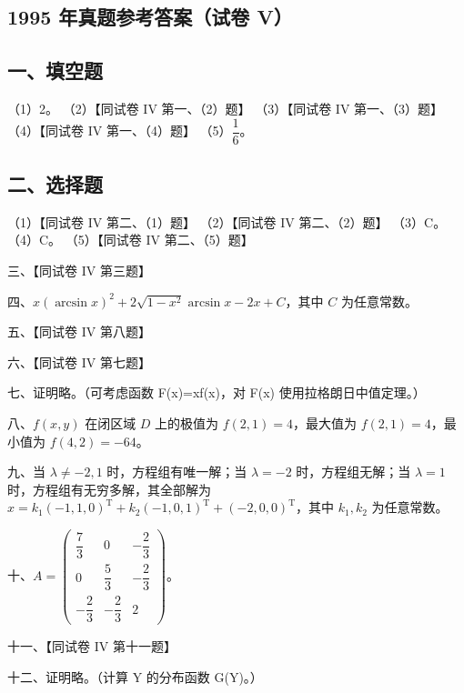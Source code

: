 \documentclass[UTF8,12pt]{ctexart}
\begin{document}
\subsection*{1995 年真题参考答案（试卷 V）}

\subsection*{一、填空题}

（1）2。 （2）【同试卷 IV 第一、（2）题】 （3）【同试卷 IV 第一、（3）题】 （4）【同试卷 IV 第一、（4）题】 （5）\(\displaystyle \dfrac{\displaystyle 1}{\displaystyle 6}\)。


\subsection*{二、选择题}

（1）【同试卷 IV 第二、（1）题】 （2）【同试卷 IV 第二、（2）题】 （3）C。 （4）C。 （5）【同试卷 IV 第二、（5）题】


三、【同试卷 IV 第三题】


四、\(\displaystyle x(\arcsin x)^2+2\sqrt{1-x^2}\arcsin x-2x+C\)，其中 \(\displaystyle C\) 为任意常数。


五、【同试卷 IV 第八题】


六、【同试卷 IV 第七题】


七、证明略。（可考虑函数 F(x)=xf(x)，对 F(x) 使用拉格朗日中值定理。）


八、\(\displaystyle f(x,\allowbreak y)\) 在闭区域 \(\displaystyle D\) 上的极值为 \(\displaystyle f(2,\allowbreak 1)=4\)，最大值为 \(\displaystyle f(2,\allowbreak 1)=4\)，最小值为 \(\displaystyle f(4,\allowbreak 2)=-64\)。


九、当 \(\displaystyle \lambda\ne-2,\allowbreak 1\) 时，方程组有唯一解；当 \(\displaystyle \lambda=-2\) 时，方程组无解；当 \(\displaystyle \lambda=1\) 时，方程组有无穷多解，其全部解为 \(\displaystyle x=k_1(-1,\allowbreak 1,\allowbreak 0)^{\mathrm T}+k_2(-1,\allowbreak 0,\allowbreak 1)^{\mathrm T}+(-2,\allowbreak 0,\allowbreak 0)^{\mathrm T}\)，其中 \(\displaystyle k_1,\allowbreak k_2\) 为任意常数。


十、\(\displaystyle A=\begin{pmatrix}\dfrac{\displaystyle 7}{\displaystyle 3}&0&-\dfrac{\displaystyle 2}{\displaystyle 3}\\0&\dfrac{\displaystyle 5}{\displaystyle 3}&-\dfrac{\displaystyle 2}{\displaystyle 3}\\-\dfrac{\displaystyle 2}{\displaystyle 3}&-\dfrac{\displaystyle 2}{\displaystyle 3}&2\end{pmatrix}\)。


十一、【同试卷 IV 第十一题】


十二、证明略。（计算 Y 的分布函数 G(Y)。）
\end{document}
